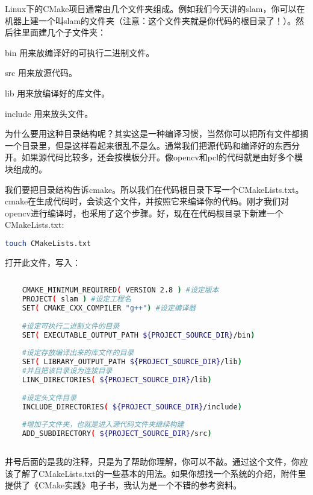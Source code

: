\documentclass[9pt,a4paper]{article}
\begin{document}
Linux下的CMake项目通常由几个文件夹组成。例如我们今天讲的slam，你可以在机器上建一个叫slam的文件夹（注意：这个文件夹就是你代码的根目录了！）。然后往里面建几个子文件夹：
\begin{framed}
\begin{description}
    \item{bin} 用来放编译好的可执行二进制文件。
    \item{src} 用来放源代码。
    \item{lib} 用来放编译好的库文件。
    \item{include} 用来放头文件。
\end{description}
\end{framed}
为什么要用这种目录结构呢？其实这是一种编译习惯，当然你可以把所有文件都搁一个目录里，但是这样看起来很乱不是么。通常我们把源代码和编译好的东西分开。如果源代码比较多，还会按模板分开。像opencv和pcl的代码就是由好多个模块组成的。

我们要把目录结构告诉cmake。所以我们在代码根目录下写一个CMakeLists.txt。cmake在生成代码时，会读这个文件，并按照它来编译你的代码。刚才我们对opencv进行编译时，也采用了这个步骤。好，现在在代码根目录下新建一个CMakeLists.txt:

\begin{lstlisting}[language=sh]
touch CMakeLists.txt
\end{lstlisting}

打开此文件，写入：
\begin{lstlisting}[language=sh]
    
    CMAKE_MINIMUM_REQUIRED( VERSION 2.8 ) #设定版本
    PROJECT( slam ) #设定工程名
    SET( CMAKE_CXX_COMPILER "g++") #设定编译器
    
    #设定可执行二进制文件的目录
    SET( EXECUTABLE_OUTPUT_PATH ${PROJECT_SOURCE_DIR}/bin) 
    
    #设定存放编译出来的库文件的目录
    SET( LIBRARY_OUTPUT_PATH ${PROJECT_SOURCE_DIR}/lib) 
    #并且把该目录设为连接目录
    LINK_DIRECTORIES( ${PROJECT_SOURCE_DIR}/lib)
    
    #设定头文件目录
    INCLUDE_DIRECTORIES( ${PROJECT_SOURCE_DIR}/include)
    
    #增加子文件夹，也就是进入源代码文件夹继续构建
    ADD_SUBDIRECTORY( ${PROJECT_SOURCE_DIR}/src)
    
\end{lstlisting}

井号后面的是我的注释，只是为了帮助你理解，你可以不敲。通过这个文件，你应该了解了CMakeLists.txt的一些基本的用法。如果你想找一个系统的介绍，附件里提供了《CMake实践》电子书，我认为是一个不错的参考资料。
\end{document}
